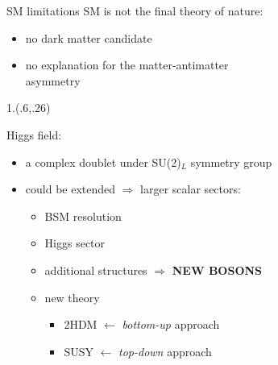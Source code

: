 \documentclass[10pt,UKenglish, leqno, xcolor = dvipsnames]{beamer}
\begin{document}
	\begin{frame}{SM limitations}
		\vfill
		SM is not the final theory of nature:
		\begin{itemize}
			\item no dark matter candidate  
			\item no explanation for the matter-antimatter\\ asymmetry 
		\end{itemize}
		\begin{textblock}{1.}(.6,.26)
		\end{textblock}
		\vspace{1cm}
		Higgs field:
		\begin{itemize}
			\item a complex doublet under SU(2)$_L$ symmetry group
			\item could be extended $\Rightarrow$ larger scalar sectors:
			\begin{itemize}
				\item BSM resolution
				\item Higgs sector
				\item additional structures $\Rightarrow$ \textbf{NEW BOSONS}
				\item new theory
				\begin{itemize}
					\item 2HDM $\leftarrow$ \textit{bottom-up} approach
					\item SUSY $\leftarrow$ \textit{top-down} approach
				\end{itemize}
			\end{itemize} 
		\end{itemize}
		\vfill
	\end{frame}
		
\end{document}
